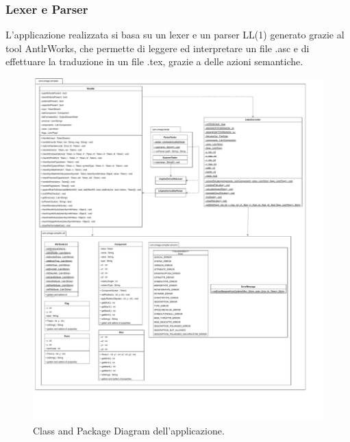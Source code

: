 \subsubsection{Lexer e Parser}
L'applicazione realizzata si basa su un lexer e un parser LL(1) generato grazie al tool AntlrWorks, che permette di leggere ed interpretare un file .asc e di effettuare la traduzione in un file .tex, grazie a delle azioni semantiche.

\begin{figure}[h!]
	\centering
	\includegraphics[width=\textwidth]{./ImageFiles/class and package diagram.pdf}
	\caption{Class and Package Diagram dell'applicazione.}
	\label{fig:class_diagram}
\end{figure}